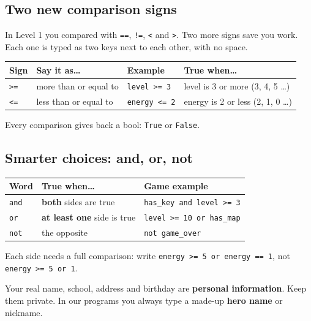 \subsection{Two new comparison signs}
In Level 1 you compared with \texttt{==}, \texttt{!=}, \texttt{<} and \texttt{>}. Two more signs save you work.
Each one is typed as two keys next to each other, with no space.
\begin{center}
\renewcommand{\arraystretch}{1.3}
\begin{tabular}{@{}llll@{}}
\toprule
\textbf{Sign} & \textbf{Say it as\ldots} & \textbf{Example} & \textbf{True when\ldots} \\ \midrule
\texttt{>=} & more than or equal to & \texttt{level >= 3} & level is 3 or more (3, 4, 5 \ldots) \\
\texttt{<=} & less than or equal to & \texttt{energy <= 2} & energy is 2 or less (2, 1, 0 \ldots) \\ \bottomrule
\end{tabular}
\end{center}
Every comparison gives back a bool: \texttt{True} or \texttt{False}.

\subsection{Smarter choices: and, or, not}
\begin{center}
\renewcommand{\arraystretch}{1.3}
\begin{tabular}{@{}lll@{}}
\toprule
\textbf{Word} & \textbf{True when\ldots} & \textbf{Game example} \\ \midrule
\texttt{and} & \textbf{both} sides are true & \texttt{has\_key and level >= 3} \\
\texttt{or}  & \textbf{at least one} side is true & \texttt{level >= 10 or has\_map} \\
\texttt{not} & the opposite & \texttt{not game\_over} \\ \bottomrule
\end{tabular}
\end{center}
Each side needs a full comparison: write \texttt{energy >= 5 or energy == 1}, not \texttt{energy >= 5 or 1}.

\begin{tip}
Your real name, school, address and birthday are \textbf{personal information}. Keep them private.
In our programs you always type a made-up \textbf{hero name} or nickname.
\end{tip}

